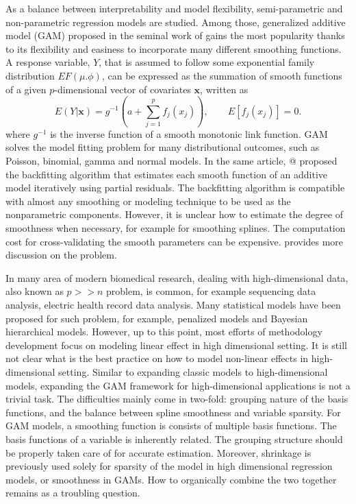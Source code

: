 \documentclass[AMA,STIX1COL,]{WileyNJD-v2}
\begin{document}
As a balance between interpretability and model flexibility,
semi-parametric and non-parametric regression models are studied. Among
those, generalized additive model (GAM) proposed in the seminal work of
\citet{Hastie1987} gains the most popularity thanks to its flexibility
and easiness to incorporate many different smoothing functions. A
response variable, \(Y\), that is assumed to follow some exponential
family distribution \(EF(\mu. \phi)\), can be expressed as the summation
of smooth functions of a given \(p\)-dimensional vector of covariates
\(\boldsymbol{x}\), written as \[
E(Y|\boldsymbol{x}) = g^{-1}(a + \sum\limits^p_{j=1}f_j(x_j)),\qquad E[f_j(x_j)] = 0.
\] where \(g^{-1}\) is the inverse function of a smooth monotonic link
function. GAM solves the model fitting problem for many distributional
outcomes, such as Poisson, binomial, gamma and normal models. In the
same article, @\citet{Hastie1987} proposed the backfitting algorithm
that estimates each smooth function of an additive model iteratively
using partial residuals. The backfitting algorithm is compatible with
almost any smoothing or modeling technique to be used as the
nonparametric components. However, it is unclear how to estimate the
degree of smoothness when necessary, for example for smoothing splines.
The computation cost for cross-validating the smooth parameters can be
expensive. \citet[PP.318-320]{Wood2017} provides more discussion on the
problem.

In many area of modern biomedical research, dealing with
high-dimensional data, also known as \(p >> n\) problem, is common, for
example sequencing data analysis, electric health record data analysis.
Many statistical models have been proposed for such problem, for
example, penalized models and Bayesian hierarchical models. However, up
to this point, most efforts of methodology development focus on modeling
linear effect in high dimensional setting. It is still not clear what is
the best practice on how to model non-linear effects in high-dimensional
setting. Similar to expanding classic models to high-dimensional models,
expanding the GAM framework for high-dimensional applications is not a
trivial task. The difficulties mainly come in two-fold: grouping nature
of the basis functions, and the balance between spline smoothness and
variable sparsity. For GAM models, a smoothing function is consists of
multiple basis functions. The basis functions of a variable is
inherently related. The grouping structure should be properly taken care
of for accurate estimation. Moreover, shrinkage is previously used
solely for sparsity of the model in high dimensional regression models,
or smoothness in GAMs. How to organically combine the two together
remains as a troubling question.
\end{document}
